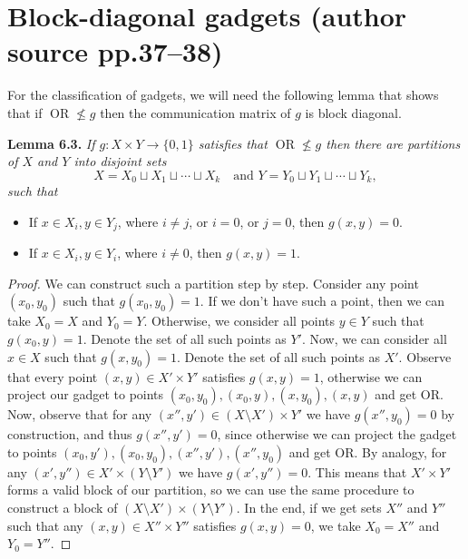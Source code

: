 \documentclass[10pt,a4paper]{article}
\newcommand{\bits}{\{0,1\}}
\newcommand{\OR}{\operatorname{OR}}
\newenvironment{originalresult}[1]{\par\medskip\noindent\textbf{#1.}\itshape}{\par\medskip}
\begin{document}
\section*{Block-diagonal gadgets (author source pp.37--38)}
For the classification of gadgets, we will need the following lemma that shows that if $\OR\nleq g$ then the communication matrix of $g$ is block diagonal.
\begin{originalresult}{Lemma 6.3}
If $g:X\times Y\to\bits$ satisfies that $\OR\nleq g$ then there are partitions of $X$ and $Y$ into disjoint sets
\[X=X_0\sqcup X_1\sqcup\cdots\sqcup X_k\quad\text{and }Y=Y_0\sqcup Y_1\sqcup\cdots\sqcup Y_k,\]
such that
\begin{itemize}
\item If $x\in X_i,y\in Y_j$, where $i\ne j$, or $i=0$, or $j=0$, then $g(x,y)=0$.
\item If $x\in X_i,y\in Y_i$, where $i\ne0$, then $g(x,y)=1$.
\end{itemize}
\end{originalresult}
\begin{proof}
We can construct such a partition step by step. Consider any point $(x_0,y_0)$ such that $g(x_0,y_0)=1$. If we don't have such a point, then we can take $X_0=X$ and $Y_0=Y$. Otherwise, we consider all points $y\in Y$ such that $g(x_0,y)=1$. Denote the set of all such points as $Y'$. Now, we can consider all $x\in X$ such that $g(x,y_0)=1$. Denote the set of all such points as $X'$. Observe that every point $(x,y)\in X'\times Y'$ satisfies $g(x,y)=1$, otherwise we can project our gadget to points $(x_0,y_0),(x_0,y),(x,y_0),(x,y)$ and get OR.
Now, observe that for any $(x'',y')\in(X\setminus X')\times Y'$ we have $g(x'',y_0)=0$ by construction, and thus $g(x'',y')=0$, since otherwise we can project the gadget to points $(x_0,y'),(x_0,y_0),(x'',y'),(x'',y_0)$ and get OR. By analogy, for any $(x',y'')\in X'\times(Y\setminus Y')$ we have $g(x',y'')=0$.
This means that $X'\times Y'$ forms a valid block of our partition, so we can use the same procedure to construct a block of $(X\setminus X')\times(Y\setminus Y')$. In the end, if we get sets $X''$ and $Y''$ such that any $(x,y)\in X''\times Y''$ satisfies $g(x,y)=0$, we take $X_0=X''$ and $Y_0=Y''$.
\end{proof}
\end{document}
